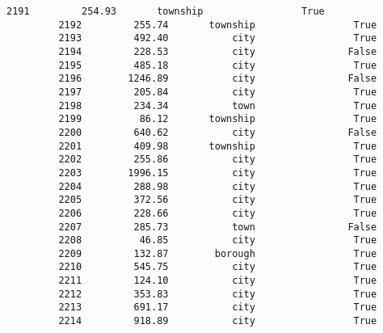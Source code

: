 \documentclass[11pt]{llncs}
\begin{document}
\begin{Verbatim}[commandchars=\\\{\}]
         2191         254.93       township                 True   
         2192         255.74       township                 True   
         2193         492.40           city                 True   
         2194         228.53           city                False   
         2195         485.18           city                 True   
         2196        1246.89           city                False   
         2197         205.84           city                 True   
         2198         234.34           town                 True   
         2199          86.12       township                 True   
         2200         640.62           city                False   
         2201         409.98       township                 True   
         2202         255.86           city                 True   
         2203        1996.15           city                 True   
         2204         288.98           city                 True   
         2205         372.56           city                 True   
         2206         228.66           city                 True   
         2207         285.73           town                False   
         2208          46.85           city                 True   
         2209         132.87        borough                 True   
         2210         545.75           city                 True   
         2211         124.10           city                 True   
         2212         353.83           city                 True   
         2213         691.17           city                 True   
         2214         918.89           city                 True   
         

\end{Verbatim}
\end{document}
